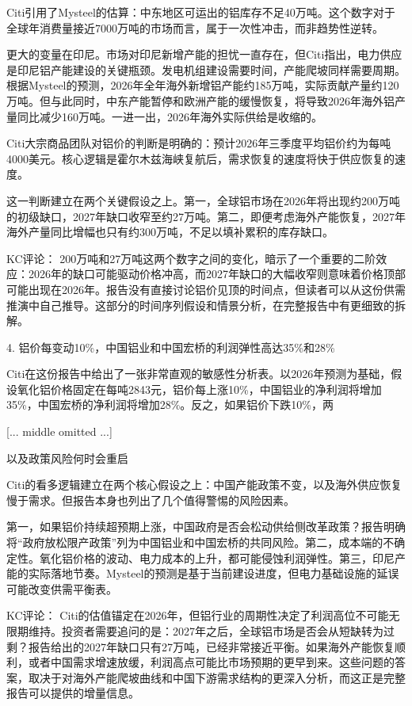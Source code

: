 \documentclass[11pt]{ctexart}
\begin{document}
Citi引用了Mysteel的估算：中东地区可运出的铝库存不足40万吨。这个数字对于全球年消费量接近7000万吨的市场而言，属于一次性冲击，而非趋势性逆转。

更大的变量在印尼。市场对印尼新增产能的担忧一直存在，但Citi指出，电力供应是印尼铝产能建设的关键瓶颈。发电机组建设需要时间，产能爬坡同样需要周期。根据Mysteel的预测，2026年全年海外新增铝产能约185万吨，实际贡献产量约120万吨。但与此同时，中东产能暂停和欧洲产能的缓慢恢复，将导致2026年海外铝产量同比减少160万吨。一进一出，2026年海外实际供给是收缩的。

Citi大宗商品团队对铝价的判断是明确的：预计2026年三季度平均铝价约为每吨4000美元。核心逻辑是霍尔木兹海峡复航后，需求恢复的速度将快于供应恢复的速度。

这一判断建立在两个关键假设之上。第一，全球铝市场在2026年将出现约200万吨的初级缺口，2027年缺口收窄至约27万吨。第二，即便考虑海外产能恢复，2027年海外产量同比增幅也只有约300万吨，不足以填补累积的库存缺口。

KC评论： 200万吨和27万吨这两个数字之间的变化，暗示了一个重要的二阶效应：2026年的缺口可能驱动价格冲高，而2027年缺口的大幅收窄则意味着价格顶部可能出现在2026年。报告没有直接讨论铝价见顶的时间点，但读者可以从这份供需推演中自己推导。这部分的时间序列假设和情景分析，在完整报告中有更细致的拆解。

4. 铝价每变动10\%，中国铝业和中国宏桥的利润弹性高达35\%和28\%

Citi在这份报告中给出了一张非常直观的敏感性分析表。以2026年预测为基础，假设氧化铝价格固定在每吨2843元，铝价每上涨10\%，中国铝业的净利润将增加35\%，中国宏桥的净利润将增加28\%。反之，如果铝价下跌10\%，两

[... middle omitted ...]

以及政策风险何时会重启

Citi的看多逻辑建立在两个核心假设之上：中国产能政策不变，以及海外供应恢复慢于需求。但报告本身也列出了几个值得警惕的风险因素。

第一，如果铝价持续超预期上涨，中国政府是否会松动供给侧改革政策？报告明确将“政府放松限产政策”列为中国铝业和中国宏桥的共同风险。第二，成本端的不确定性。氧化铝价格的波动、电力成本的上升，都可能侵蚀利润弹性。第三，印尼产能的实际落地节奏。Mysteel的预测是基于当前建设进度，但电力基础设施的延误可能改变供需平衡表。

KC评论： Citi的估值锚定在2026年，但铝行业的周期性决定了利润高位不可能无限期维持。投资者需要追问的是：2027年之后，全球铝市场是否会从短缺转为过剩？报告给出的2027年缺口只有27万吨，已经非常接近平衡。如果海外产能恢复顺利，或者中国需求增速放缓，利润高点可能比市场预期的更早到来。这些问题的答案，取决于对海外产能爬坡曲线和中国下游需求结构的更深入分析，而这正是完整报告可以提供的增量信息。
\end{document}
